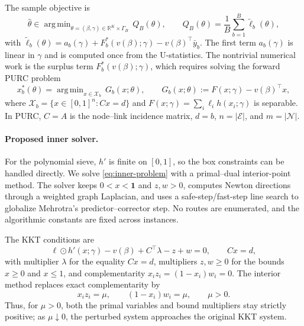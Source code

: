 \documentclass[12pt]{article}
\newcommand{\cN}{\mathcal{N}}
\newcommand{\cE}{\mathcal{E}}
\newcommand{\cX}{\mathcal{X}}
\DeclareMathOperator*{\argmin}{arg\,min}
\begin{document}
The sample objective is
\begin{equation}\label{eq:outer-problem}
    \hat\theta \in \argmin_{\theta = (\beta,\gamma) \in \mathbb{R}^K \times \Gamma_B}\, Q_B(\theta), \qquad Q_B(\theta) = \frac{1}{B}\sum_{b=1}^B \tilde\ell_b(\theta),
\end{equation}
with $\tilde\ell_b(\theta) = a_b(\gamma) + F^*_b(v(\beta);\gamma)
- v(\beta)^\top \bar{y}_b$. The first term $a_b(\gamma)$ is linear in
$\gamma$ and is computed once from the U-statistics. The nontrivial numerical
work is the surplus term $F^*_b(v(\beta);\gamma)$, which requires solving the
forward PURC problem
\begin{equation}\label{eq:inner-problem}
    x^*_b(\theta) = \argmin_{x \in \cX_b}\, G_b(x;\theta), \qquad G_b(x;\theta) := F(x;\gamma) - v(\beta)^\top x,
\end{equation}
where $\cX_b = \{x \in [0,1]^n : Cx=d\}$ and
$F(x;\gamma)=\sum_i \ell_i h(x_i;\gamma)$ is separable. In PURC, $C=A$ is the
node--link incidence matrix, $d=b$, $n=|\cE|$, and $m=|\cN|$.

\paragraph{Proposed inner solver.} For the polynomial sieve, $h'$ is finite on
$[0,1]$, so the box constraints can be handled directly. We solve
\eqref{eq:inner-problem} with a primal--dual interior-point method. The solver keeps
$0<x<\mathbf 1$ and $z,w>0$, computes Newton directions through a weighted graph
Laplacian, and uses a safe-step/fast-step line search to globalize Mehrotra's
predictor--corrector step. No routes are enumerated, and the algorithmic constants
are fixed across instances.

The KKT conditions are
\[
    \ell\odot h'(x;\gamma)-v(\beta)+C^\top\lambda-z+w=0,\qquad
    Cx=d,
\]
with multiplier $\lambda$ for the equality $Cx=d$, multipliers $z,w\ge0$ for the
bounds $x\ge0$ and $x\le1$, and complementarity $x_i z_i=(1-x_i)w_i=0$. The
interior method replaces exact complementarity by
\begin{equation}\label{eq:kkt}
    x_i z_i=\mu,\qquad (1-x_i)w_i=\mu,\qquad \mu>0.
\end{equation}
Thus, for $\mu>0$, both the primal variables and bound multipliers stay strictly
positive; as $\mu\downarrow0$, the perturbed system approaches the original KKT
system.
\end{document}
